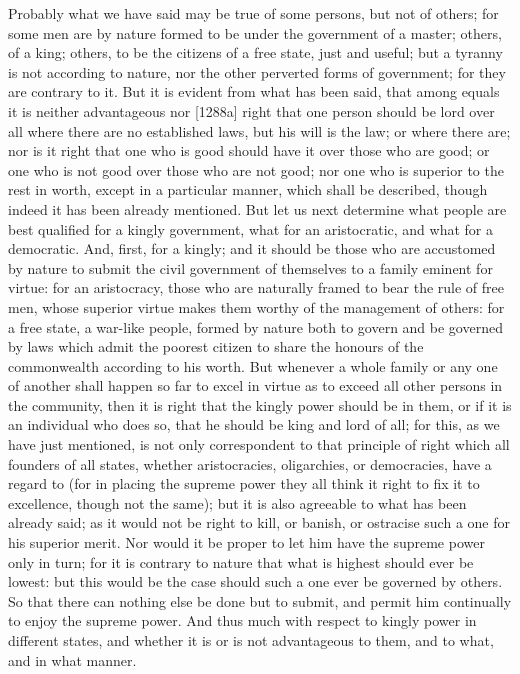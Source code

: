Probably what we have said may be true of some persons, but not of others;
for some men are by nature formed to be under the government of a master;
others, of a king; others, to be the citizens of a free state, just and
useful; but a tyranny is not according to nature, nor the other perverted
forms of government; for they are contrary to it. But it is evident from
what has been said, that among equals it is neither advantageous nor
[1288a] right that one person should be lord over all where there are no
established laws, but his will is the law; or where there are; nor is it
right that one who is good should have it over those who are good; or one
who is not good over those who are not good; nor one who is superior to
the rest in worth, except in a particular manner, which shall be
described, though indeed it has been already mentioned. But let us next
determine what people are best qualified for a kingly government, what for
an aristocratic, and what for a democratic. And, first, for a kingly; and
it should be those who are accustomed by nature to submit the civil
government of themselves to a family eminent for virtue: for an
aristocracy, those who are naturally framed to bear the rule of free men,
whose superior virtue makes them worthy of the management of others: for a
free state, a war-like people, formed by nature both to govern and be
governed by laws which admit the poorest citizen to share the honours of
the commonwealth according to his worth. But whenever a whole family or
any one of another shall happen so far to excel in virtue as to exceed all
other persons in the community, then it is right that the kingly power
should be in them, or if it is an individual who does so, that he should
be king and lord of all; for this, as we have just mentioned, is not only
correspondent to that principle of right which all founders of all states,
whether aristocracies, oligarchies, or democracies, have a regard to (for
in placing the supreme power they all think it right to fix it to
excellence, though not the same); but it is also agreeable to what has
been already said; as it would not be right to kill, or banish, or
ostracise such a one for his superior merit. Nor would it be proper to let
him have the supreme power only in turn; for it is contrary to nature that
what is highest should ever be lowest: but this would be the case should
such a one ever be governed by others. So that there can nothing else be
done but to submit, and permit him continually to enjoy the supreme power.
And thus much with respect to kingly power in different states, and
whether it is or is not advantageous to them, and to what, and in what
manner.

